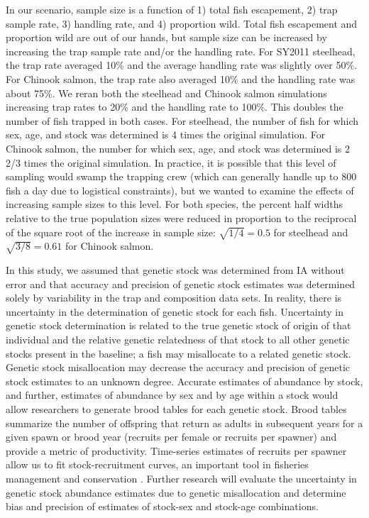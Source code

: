 \documentclass[12pt]{article}
\begin{document}
In our scenario, sample size is a function of 1) total fish escapement, 2) trap sample rate, 3) handling rate, and 4) proportion wild. Total fish escapement and proportion wild are out of our hands, but sample size can be increased by increasing the trap sample rate and/or the handling rate. For SY2011 steelhead, the trap rate averaged 10\% and the average handling rate was slightly over 50\%. For Chinook salmon, the trap rate also averaged 10\% and the handling rate was about 75\%. We reran both the steelhead and Chinook salmon simulations increasing trap rates to 20\% and the handling rate to 100\%. This doubles the number of fish trapped in both cases. For steelhead, the number of fish for which sex, age, and stock was determined is 4 times the original simulation. For Chinook salmon, the number for which sex, age, and stock was determined is 2 2/3 times the original simulation. In practice, it is possible that this level of sampling would swamp the trapping crew (which can generally handle up to 800 fish a day due to logistical constraints), but we wanted to examine the effects of increasing sample sizes to this level. For both species, the percent half widths relative to the true population sizes were reduced in proportion to the reciprocal of the square root of the increase in sample size: $\sqrt{1/4} = 0.5$ for steelhead and $\sqrt{3/8} = 0.61$  for Chinook salmon.

In this study, we assumed that genetic stock was determined from IA without error and that accuracy and precision of genetic stock estimates was determined solely by variability in the trap and composition data sets. In reality, there is uncertainty in the determination of genetic stock for each fish. Uncertainty in genetic stock determination is related to the true genetic stock of origin of that individual and the relative genetic relatedness of that stock to all other genetic stocks present in the baseline; a fish may misallocate to a related genetic stock. Genetic stock misallocation may decrease the accuracy and precision of genetic stock estimates to an unknown degree. Accurate estimates of abundance by stock, and further, estimates of abundance by sex and by age within a stock would allow researchers to generate brood tables for each genetic stock. Brood tables summarize the number of offspring that return as adults in subsequent years for a given spawn or brood year (recruits per female or recruits per spawner) and provide a metric of productivity. Time-series estimates of recruits per spawner allow us to fit stock-recruitment curves, an important tool in fisheries management and conservation \cite{Ricker1973,Hilborn2003}. Further research will evaluate the uncertainty in genetic stock abundance estimates due to genetic misallocation and determine bias and precision of estimates of stock-sex and stock-age combinations.
\end{document}
